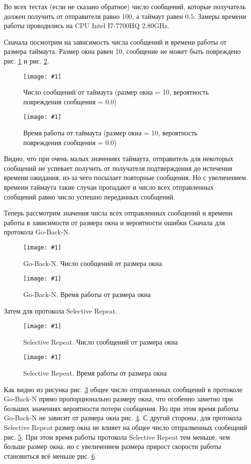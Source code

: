 \documentclass[a4paper,12pt]{article}
\newcommand{\plot}[3]{
    \begin{figure}[H]
        \begin{center}
            \texttt{[image: \#1]}
            \caption{#2}
            \label{#3}
        \end{center}
    \end{figure}
}
\begin{document}
    Во всех тестах (если не сказано обратное) число сообщений, которые получатель должен получить от отправителя равно 100,
    а таймаут равен $ 0.5 $. Замеры времени работы проводились на CPU Intel I7-7700HQ 2.80GHz.

    Сначала посмотрим на зависимость числа сообщений и времени работы от размера таймаута.
    Размер окна равен 10, сообщение не может быть повреждено рис. \ref{p:timeoutsMessageNum} и рис. \ref{p:timeoutsWorkingTime}.

    \plot{timeoutsMessageNum}{Число сообщений от таймаута (размер окна = 10, вероятность повреждения сообщения = 0.0)}{p:timeoutsMessageNum}
    \plot{timeoutsWorkingTime}{Время работы от таймаута (размер окна = 10, вероятность повреждения сообщения = 0.0)}{p:timeoutsWorkingTime}

    Видно, что при очень малых значениях таймаута, отправитель для некоторых сообщений не успевает получить от получателя
    подтверждения до истечения времени ожидания, из-за чего посылает повторные сообщения.
    Но с увеличением времени таймаута такие случаи пропадают и число всех отправленных сообщений равно число успешно переданных сообщений.

    Теперь рассмотрим значения числа всех отправленных сообщений и времени работы в зависимости от размера окна и вероятности ошибки
    Сначала для протокола Go-Back-N.

    \plot{rateSizeGBNMessageNum}{Go-Back-N. Число сообщений от размера окна}{p:rateSizeGBNMessageNum}
    \plot{rateSizeGBNWorkingTime}{Go-Back-N. Время работы от размера окна}{p:rateSizeGBNWorkingTime}

    Затем для протокола Selective Repeat.

    \plot{rateSizeSRPMessageNum}{Selective Repeat. Число сообщений от размера окна}{p:rateSizeSRPMessageNum}
    \plot{rateSizeSRPWorkingTime}{Selective Repeat. Время работы от размера окна}{p:rateSizeSRPWorkingTime}

    Как видно из рисунка рис. \ref{p:rateSizeGBNMessageNum} общее число отправленных сообщений в протоколе Go-Back-N
    прямо пропорционально размеру окна, что особенно заметно при больших значениях вероятности потери сообщения.
    Но при этом время работы Go-Back-N не зависит от размера окна рис. \ref{p:rateSizeGBNWorkingTime}.
    С другой стороны, для протокола Selective Repeat размер окна не влияет на общее число отпралвенных сообещний рис. \ref{p:rateSizeSRPMessageNum}.
    При этом время работы протокола Selective Repeat тем меньше, чем больше размер окна,
    но с увеличением размера прирост скорости работы становиться всё меньше рис. \ref{p:rateSizeSRPWorkingTime}. 
\end{document}

